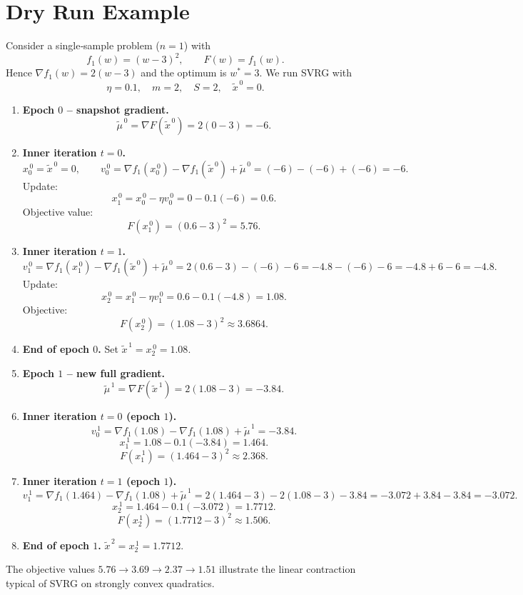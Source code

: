 \documentclass{article}
\begin{document}
\section*{Dry Run Example}
Consider a single‑sample problem ($n=1$) with
\[
f_1(w)= (w-3)^2,\qquad F(w)=f_1(w).
\]
Hence $\nabla f_1(w)=2(w-3)$ and the optimum is $w^{*}=3$.
We run SVRG with
\[
\eta=0.1,\quad m=2,\quad S=2,\quad \tilde{x}^{\,0}=0.
\]

\begin{enumerate}[label=\textbf{Step \arabic*:}, leftmargin=*, nosep]
\item \textbf{Epoch $0$ – snapshot gradient.}
\[
\tilde{\mu}^{\,0}= \nabla F(\tilde{x}^{\,0})=2(0-3)=-6.
\]
\item \textbf{Inner iteration $t=0$.}
\[
x_{0}^{\,0}= \tilde{x}^{\,0}=0,\qquad 
v_{0}^{\,0}= \nabla f_1(x_{0}^{\,0})-\nabla f_1(\tilde{x}^{\,0})+\tilde{\mu}^{\,0}
           =(-6)-(-6)+(-6)=-6.
\]
Update:
\[
x_{1}^{\,0}=x_{0}^{\,0}-\eta v_{0}^{\,0}=0-0.1(-6)=0.6.
\]
Objective value:
\[
F(x_{1}^{\,0})=(0.6-3)^2=5.76.
\]

\item \textbf{Inner iteration $t=1$.}
\[
v_{1}^{\,0}= \nabla f_1(x_{1}^{\,0})-\nabla f_1(\tilde{x}^{\,0})+\tilde{\mu}^{\,0}
           =2(0.6-3)-(-6)-6 = -4.8-(-6)-6 = -4.8+6-6 = -4.8.
\]
Update:
\[
x_{2}^{\,0}=x_{1}^{\,0}-\eta v_{1}^{\,0}=0.6-0.1(-4.8)=1.08.
\]
Objective:
\[
F(x_{2}^{\,0})=(1.08-3)^2\approx3.6864.
\]

\item \textbf{End of epoch $0$.} Set $\tilde{x}^{\,1}=x_{2}^{\,0}=1.08$.

\item \textbf{Epoch $1$ – new full gradient.}
\[
\tilde{\mu}^{\,1}= \nabla F(\tilde{x}^{\,1})=2(1.08-3)=-3.84.
\]

\item \textbf{Inner iteration $t=0$ (epoch $1$).}
\[
v_{0}^{\,1}= \nabla f_1(1.08)-\nabla f_1(1.08)+\tilde{\mu}^{\,1}= -3.84.
\]
\[
x_{1}^{\,1}=1.08-0.1(-3.84)=1.464.
\]
\[
F(x_{1}^{\,1})=(1.464-3)^2\approx2.368.
\]

\item \textbf{Inner iteration $t=1$ (epoch $1$).}
\[
v_{1}^{\,1}= \nabla f_1(1.464)-\nabla f_1(1.08)+\tilde{\mu}^{\,1}
           =2(1.464-3)-2(1.08-3)-3.84
           =-3.072+3.84-3.84=-3.072.
\]
\[
x_{2}^{\,1}=1.464-0.1(-3.072)=1.7712.
\]
\[
F(x_{2}^{\,1})=(1.7712-3)^2\approx1.506.
\]

\item \textbf{End of epoch $1$.} $\tilde{x}^{\,2}=x_{2}^{\,1}=1.7712$.
\end{enumerate}
The objective values $5.76\to3.69\to2.37\to1.51$ illustrate the linear contraction typical of SVRG on strongly convex quadratics.
\end{document}

